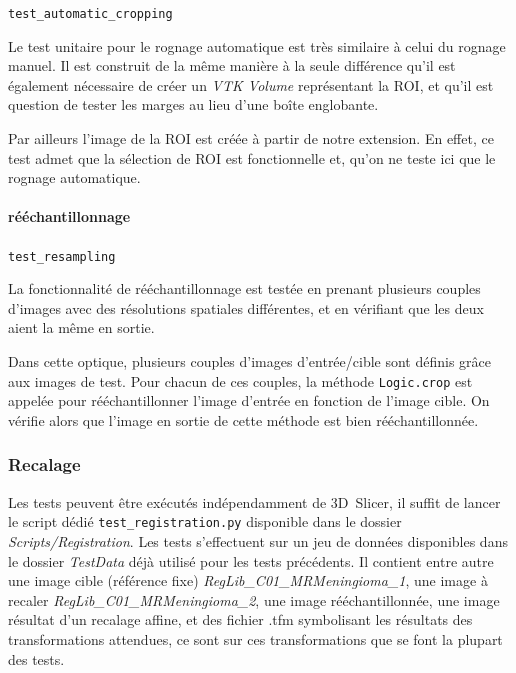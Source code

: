 \documentclass{article}
\newcommand{\subsubsubsection}[1]{\paragraph{#1}\par\noindent\bigskip}
\newcommand{\method}[1]{\hspace{1in}\texttt{#1}\bigskip}
\begin{document}
{{{{                \bigskip
                \method{test\_automatic\_cropping}
                \label{method:test_automatic_cropping}

                Le test unitaire pour le rognage automatique est très similaire à celui du rognage manuel. Il est construit de la même manière à la seule différence qu'il est également nécessaire de créer un \textit{VTK Volume} représentant la ROI, et qu'il est question de tester les marges au lieu d'une boîte englobante.

                Par ailleurs l'image de la ROI est créée à partir de notre extension. En effet, ce test admet que la sélection de ROI est fonctionnelle et, qu'on ne teste ici que le rognage automatique.
            }

            {
                \bigskip
                \subsubsubsection{rééchantillonnage}

                \method{test\_resampling}
                \label{method:test_resampling}

                La fonctionnalité de rééchantillonnage est testée en prenant plusieurs couples d'images avec des résolutions spatiales différentes, et en vérifiant que les deux aient la même en sortie.

                \bigskip

                Dans cette optique, plusieurs couples d'images d'entrée/cible sont définis grâce aux images de test. Pour chacun de ces couples, la méthode \texttt{Logic.crop} est appelée pour rééchantillonner l'image d'entrée en fonction de l'image cible. On vérifie alors que l'image en sortie de cette méthode est bien rééchantillonnée.
            }
        }

        {
            \subsubsection{Recalage}
            \label{subsubsec:registration-unit-testing}

            Les tests peuvent être exécutés indépendamment de 3D~Slicer, il suffit de lancer le script dédié \texttt{test\_registration.py} disponible dans le dossier \textit{Scripts/Registration}. Les tests s'effectuent sur un jeu de données disponibles dans le dossier \textit{TestData} déjà utilisé pour les tests précédents. Il contient entre autre une image cible (référence fixe) \textit{RegLib\_C01\_MRMeningioma\_1}, une image à recaler \textit{RegLib\_C01\_MRMeningioma\_2}, une image rééchantillonnée, une image résultat d'un recalage affine, et des fichier .tfm symbolisant les résultats des transformations attendues, ce sont sur ces transformations que se font la plupart des tests.

}}}
\end{document}
